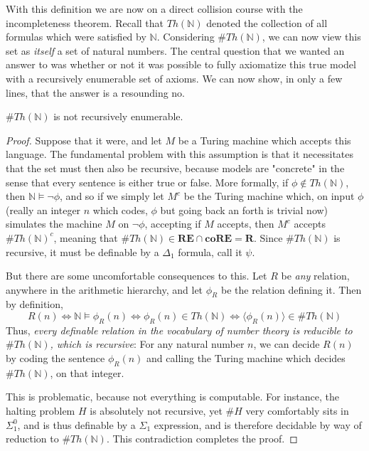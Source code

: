  With this definition we are now on a direct collision course with the incompleteness theorem. Recall that $Th(\mathbb{N})$ denoted the collection of all formulas which were satisfied by $\mathbb{N}$. Considering $\#Th(\mathbb{N})$, we can now view this set as \textit{itself} a set of natural numbers. The central question that we wanted an answer to was whether or not it was possible to fully axiomatize this true model with a recursively enumerable set of axioms. We can now show, in only a few lines, that the answer is a resounding no.
\begin{theorem}
    $\#Th(\mathbb{N})$ is not recursively enumerable. 
\end{theorem}
\begin{proof}
    Suppose that it were, and let $M$ be a Turing machine which accepts this language. The fundamental problem with this assumption is that it necessitates that the set must then also be recursive, because models are "concrete" in the sense that every sentence is either true or false. More formally, if $\phi \notin Th(\mathbb{N})$, then $\mathbb{N} \models \neg \phi$, and so if we simply let $M^c$ be the Turing machine which, on input $\phi$ (really an integer $n$ which codes, $\phi$ but going back an forth is trivial now) simulates the machine $M$ on $\neg \phi$, accepting if $M$ accepts, then $M^c$ accepts $\#Th(\mathbb{N})^c$, meaning that $\#Th(\mathbb{N}) \in \textbf{RE} \cap \textbf{coRE} = \textbf{R}$. Since $\#Th(\mathbb{N})$ is recursive, it must be definable by a $\Delta_1$ formula, call it $\psi$.
    \par But there are some uncomfortable consequences to this. Let $R$ be \textit{any} relation, anywhere in the arithmetic hierarchy, and let $\phi_R$ be the relation defining it. Then by definition, \[ R(n) \iff \mathbb{N} \models \phi_R(n) \iff \phi_R(n) \in Th(\mathbb{N}) \iff \langle \phi_R(n) \rangle \in \#Th(\mathbb{N}) \]
    Thus, \textit{every definable relation in the vocabulary of number theory is reducible to $\#Th(\mathbb{N})$, which is recursive}: For any natural number $n$, we can decide $R(n)$ by coding the sentence $\phi_R(n)$ and calling the Turing machine which decides $\#Th(\mathbb{N})$, on that integer.
    \par This is problematic, because not everything is computable. For instance, the halting problem $H$ is absolutely not recursive, yet $\#H$ very comfortably sits in $\Sigma^0_1$, and is thus definable by a $\Sigma_1$ expression, and is therefore decidable by way of reduction to $\#Th(\mathbb{N})$. This contradiction completes the proof.
\end{proof}
